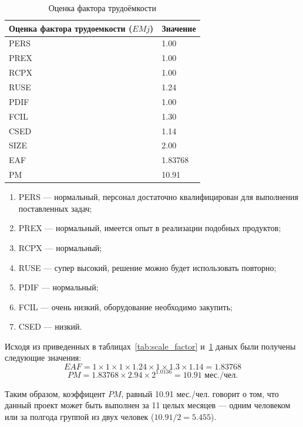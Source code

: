 \begin{table}[H]
    \caption{Оценка фактора трудоёмкости}
    \centering

    \emergencystretch=10pt
    \begin{tabular}{@{}ll@{}}
        \toprule
        \textbf{Оценка фактора трудоемкости ($EMj$)} & \textbf{Значение} \\
        \midrule
        PERS & 1.00 \\
        PREX & 1.00 \\
        RCPX & 1.00 \\
        RUSE & 1.24 \\
        PDIF & 1.00 \\
        FCIL & 1.30 \\
        CSED & 1.14 \\
        SIZE & 2.00 \\
        \midrule
        EAF & 1.83768 \\
        PM & 10.91 \\
        \bottomrule
    \end{tabular}
    \label{tab:labor_factor}
\end{table}

\begin{enumerate}
    \item PERS --- нормальный, персонал достаточно квалифицирован для выполнения поставленных задач;
    \item PREX --- нормальный, имеется опыт в реализации подобных продуктов;
    \item RCPX --- нормальный;
    \item RUSE --- супер высокий, решение можно будет использовать повторно;
    \item PDIF --- нормальный;
    \item FCIL --- очень низкий, оборудование необходимо закупить;
    \item CSED --- низкий.
\end{enumerate}

Исходя из приведенных в таблицах~\ref{tab:scale_factor} и~\ref{tab:labor_factor} даных были получены следующие значения:
$$EAF = 1 \times 1 \times 1 \times 1.24 \times 1 \times 1.3 \times 1.14 = 1.83768$$
$$PM = 1.83768 \times 2.94  \times 2^{1.0136} = 10.91 \text{ мес./чел.}$$

Таким образом, коэффицент $PM$, равный 10.91 мес./чел. говорит о том, что данный проект может быть выполнен за 11 целых месяцев --- одним человеком или за полгода группой из двух человек ($10.91/2=5.455$).

